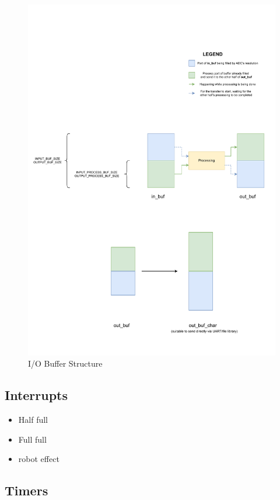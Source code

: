 \documentclass[11pt]{article}
\begin{document}
\begin{figure}[H]
    \centering
    \includegraphics[width=1\textwidth, trim={0cm 1cm 0cm 4cm}, clip]{IO_Buffer_Structure.pdf}
    \caption{I/O Buffer Structure}
    \end{figure}

\subsection{Interrupts}
\label{sec:org86f3d13}

\begin{itemize}
\item Half full
\item Full full
\item robot effect
\end{itemize}

\subsection{Timers}
\label{sec:org88b2049}
\end{document}
